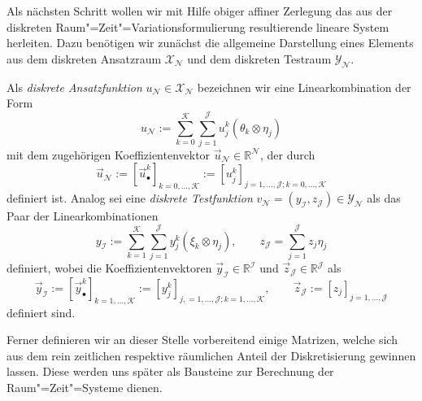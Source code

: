 \documentclass[../main.tex]{subfiles}
\begin{document}
Als nächsten Schritt wollen wir mit Hilfe obiger affiner Zerlegung das aus der diskreten Raum"=Zeit"=Variationsformulierung resultierende lineare System herleiten.
Dazu benötigen wir zunächst die allgemeine Darstellung eines Elements aus dem diskreten Ansatzraum $\mathcal X_{\mathcal N}$ und dem diskreten Testraum $\mathcal Y_{\mathcal N}$.

\begin{Definition}
\label{definition:diskrete_ansatz_und_testfunktionen}
    Als \emph{diskrete Ansatzfunktion} $u_{\mathcal N} \in \mathcal X_{\mathcal N}$ bezeichnen wir eine Linearkombination der Form
    \begin{equation}
    \label{eq:darstellung_diskrete_ansatzfunktion}
        u_{\mathcal N} := \sum_{k = 0}^{\mathcal K} \sum_{j = 1}^{\mathcal J} u_{j}^{k} (\theta_{k} \otimes \eta_{j})
    \end{equation}
    mit dem zugehörigen Koeffizientenvektor $\vec{u}_{\mathcal N} \in \mathbb{R}^{\mathcal N}$, der durch
    \begin{equation}
        \vec{u}_{\mathcal N} := [\vec{u}^{k}_{\bullet}]_{k = 0, \dots, \mathcal K} := [ u^{k}_{j} ]_{j = 1, \dots, \mathcal J;k = 0, \dots, \mathcal K}
    \end{equation}
    definiert ist.
    Analog sei eine \emph{diskrete Testfunktion} $v_{\mathcal N} = (y_{\mathcal I}, z_{\mathcal J}) \in \mathcal Y_{\mathcal N}$ als das Paar der Linearkombinationen
    \begin{equation}
    \label{eq:darstellung_diskrete_testfunktion}
        y_{\mathcal I} := \sum_{k = 1}^{\mathcal K} \sum_{j = 1}^{\mathcal J} y_{j}^{k} (\xi_{k} \otimes \eta_{j}), \qquad
        z_{\mathcal J} = \sum_{j = 1}^{\mathcal J} z_{j} \eta_{j}
    \end{equation}
    definiert,
    wobei die Koeffizientenvektoren $\vec{y}_{\mathcal I} \in \mathbb{R}^{\mathcal I}$ und $\vec{z}_{\mathcal J} \in \mathbb{R}^{\mathcal J}$ als
    \begin{equation}
        \vec{y}_{\mathcal I} := [\vec{y}^{k}_{\bullet}]_{k = 1, \dots, \mathcal K} := [y^{k}_{j}]_{j, = 1, \dots, \mathcal J; k = 1, \dots, \mathcal K}, \qquad
        \vec{z}_{\mathcal J} := [z_{j}]_{j = 1, \dots, \mathcal J}
    \end{equation}
    definiert sind.
\end{Definition}

Ferner definieren wir an dieser Stelle vorbereitend einige Matrizen, welche sich aus dem rein zeitlichen respektive räumlichen Anteil der Diskretisierung gewinnen lassen.
Diese werden uns später als Bausteine zur Berechnung der Raum"=Zeit"=Systeme dienen.
\end{document}
